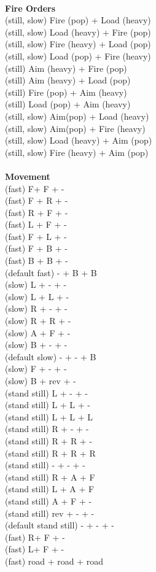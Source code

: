 \ \\ {\bf Fire Orders } \\
(still, slow) Fire (pop) + Load (heavy) \\
(still, slow) Load (heavy) + Fire (pop) \\
(still, slow) Fire (heavy) + Load (pop) \\
(still, slow) Load (pop) + Fire (heavy) \\
(still) Aim (heavy) + Fire (pop) \\
(still) Aim (heavy) + Load (pop) \\
(still) Fire (pop) + Aim (heavy) \\
(still) Load (pop) + Aim (heavy) \\
(still, slow) Aim(pop) + Load (heavy) \\
(still, slow) Aim(pop) + Fire (heavy) \\
(still, slow) Load (heavy) + Aim (pop) \\
(still, slow) Fire (heavy) + Aim (pop) \\
\ \\ {\bf Movement } \\
(fast) F+ F + - \\
(fast) F + R + - \\
(fast) R + F + - \\
(fast) L + F + -  \\
(fast) F + L + - \\
(fast) F + B + - \\
(fast) B + B + - \\
(default fast) - + B + B \\
(slow) L + - + - \\
(slow) L + L + - \\
(slow) R + - + - \\
(slow) R + R + - \\
(slow) A + F + - \\
(slow) B + - + - \\
(default slow) - + - + B \\
(slow) F + - + - \\
(slow) B + rev + - \\
(stand still) L + - + - \\
(stand still) L + L + - \\
(stand still) L + L + L \\
(stand still) R + - + - \\
(stand still) R + R + - \\
(stand still) R + R + R \\
(stand still) - + - + - \\
(stand still) R + A + F \\
(stand still) L + A + F \\
(stand still) A + F + - \\
(stand still) rev + - + - \\
(default stand still) - + - + - \\
(fast) R+ F + - \\
(fast) L+ F + - \\
(fast) road + road + road \\



